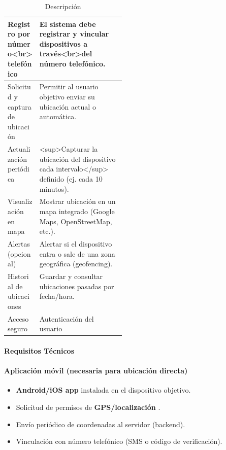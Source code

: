 \begin{table}[H]
\centering
\small
\caption[Descripción (tabla 1)]{Descripción}
\begin{tabularx}{\linewidth}{>{\raggedright\arraybackslash}p{0.27\linewidth} >{\raggedright\arraybackslash}X}
\toprule
\textbf{Registro por número<br>telefónico} & \textbf{El sistema debe registrar y vincular dispositivos a través<br>del número telefónico.} \\
\midrule
Solicitud y captura de \newline ubicación & Permitir al usuario objetivo enviar su ubicación actual o \newline automática. \\
Actualización periódica & <sup>Capturar la ubicación del dispositivo cada intervalo</\allowbreak{}sup> \newline definido (ej. cada 10 minutos). \\
Visualización en mapa & Mostrar ubicación en un mapa integrado (Google Maps, \newline OpenStreetMap, etc.). \\
Alertas (opcional) & Alertar si el dispositivo entra o sale de una zona geográfica \newline (geofencing). \\
Historial de ubicaciones & Guardar y consultar ubicaciones pasadas por fecha/\allowbreak{}hora. \\
Acceso seguro & Autenticación del usuario \\
\bottomrule
\end{tabularx}
\end{table}

\paragraph{Requisitos Técnicos}

\paragraph{Aplicación móvil (necesaria para ubicación directa)}

\begin{itemize}
  \item \textbf{Android/iOS app} instalada en el dispositivo objetivo.
  \item Solicitud de permisos de \textbf{GPS/localización} .
  \item Envío periódico de coordenadas al servidor (backend).
  \item Vinculación con número telefónico (SMS o código de verificación).
\end{itemize}

